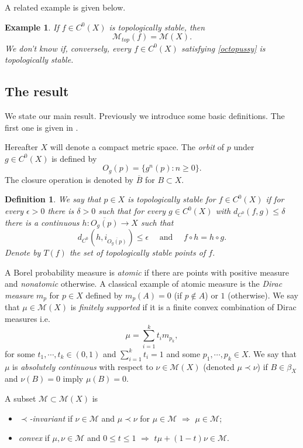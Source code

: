 \documentclass[11pt,letterpaper]{amsart}
\theoremstyle{plain}
\newtheorem{definition}{Definition}
\newtheorem{example}{Example}
\begin{document}
A related example is given below.

\begin{example}
If $f\in C^0(X)$ is topologically stable, then
\begin{equation}
\label{octopussy}
\mathcal{M}_{top}(f)=\mathcal{M}(X).
\end{equation}
We don't know if, conversely, every $f\in C^0(X)$ satisfying \eqref{octopussy} is topologically stable.
\end{example}





\subsection{The result}
We state our main result.
Previously we introduce some basic definitions.
The first one is given in \cite{klm}.

Hereafter $X$ will denote a compact metric space.
The {\em orbit} of $p$ under $g\in C^0(X)$ is defined by
$$O_g(p)=\{g^n(p):n\geq0\}.$$
The closure operation is denoted by $\overline{B}$ for $B\subset X$.



\begin{definition}
We say that $p\in X$ is {\em topologically stable} for $f\in C^0(X)$ if
for every $\epsilon>0$ there is $\delta>0$ such that for every $g\in C^0(X)$ with $d_{C^0}(f,g)\leq\delta$ there is a continuous $h:\overline{O_g(p)}\to X$ such that
$$
d_{C^0}(h,i_{\overline{O_g(p)}})\leq\epsilon\quad\mbox{ and }\quad
f\circ h=h\circ g.
$$
Denote by $T(f)$ the set of topologically stable points of $f$.
\end{definition}

A Borel probability measure is {\em atomic} if there are points with positive measure
and {\em nonatomic} otherwise.
A classical example of atomic measure is the {\em Dirac measure} $m_p$ for $p\in X$
defined by $m_p(A)=0$ (if $p\notin A$) or $1$ (otherwise).
We say that $\mu\in\mathcal{M}(X)$ is {\em finitely supported} if it is a finite convex combination of Dirac measures i.e.
$$
\mu=\sum_{i=1}^kt_i m_{p_k},
$$
for some $t_1,\cdots, t_k\in (0,1)$ and
$\sum_{i=1}^kt_i=1$ and some $p_1,\cdots, p_k\in X$.
 We say that $\mu$
is {\em absolutely continuous} with respect to $\nu\in\mathcal{M}(X)$ (denoted $\mu\prec\nu$) if $B\in \beta_X$ and $\nu(B)=0$ imply $\mu(B)=0$.

A subset $\mathcal{M}\subset \mathcal{M}(X)$ is 
\begin{itemize}
\item
{\em $\prec$-invariant} if
$\nu\in\mathcal{M}$ and $\mu\prec\nu$ for $\mu\in\mathcal{M}$ $\Longrightarrow$ $\mu\in\mathcal{M}$;
\item
{\em convex} if $\mu,\nu\in\mathcal{M}$ and $0\leq t\leq 1$
$\Longrightarrow$ $t\mu+(1-t)\nu\in \mathcal{M}$. 
\end{itemize}
\end{document}
